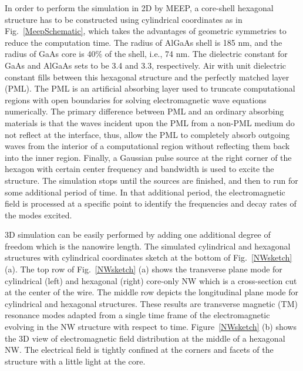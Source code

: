 In order to perform the simulation in 2D by MEEP, a core-shell hexagonal
structure has to be constructed using cylindrical coordinates as in
Fig.~\ref{MeepSchematic}, which takes the advantages of geometric symmetries to
reduce the computation time. The radius of AlGaAs shell is 185 nm, and the
radius of GaAs core is 40\% of the shell, i.e., 74 nm. The dielectric constant
for GaAs and AlGaAs sets to be 3.4 and 3.3, respectively. Air with unit
dielectric constant fills between this hexagonal structure and the perfectly
matched layer (PML). The PML is an artificial absorbing layer used to truncate
computational regions with open boundaries for solving electromagnetic wave
equations numerically. The primary difference between PML and an ordinary
absorbing materials is that the waves incident upon the PML from a non-PML
medium do not reflect at the interface, thus, allow the PML to completely
absorb outgoing waves from the interior of a computational region without
reflecting them back into the inner region. Finally, a Gaussian pulse source
at the right corner of the hexagon with certain center frequency and bandwidth
is used to excite the structure. The simulation stops until the sources are
finished, and then to run for some additional period of time. In that
additional period, the electromagnetic field is processed at a specific point
to identify the frequencies and decay rates of the modes excited.

3D simulation can be easily performed by adding one additional degree of
freedom which is the nanowire length. The simulated cylindrical and hexagonal
structures with cylindrical coordinates sketch at the bottom of
Fig.~\ref{NWsketch} (a). The top row of Fig.~\ref{NWsketch} (a) shows the
transverse plane mode for cylindrical (left) and hexagonal (right) core-only NW
which is a cross-section cut at the center of the wire. The middle row depicts
the longitudinal plane mode for cylindrical and hexagonal structures. These
results are transverse magnetic (TM) resonance modes adapted from a single time
frame of the electromagnetic evolving in the NW structure with respect to time.
Figure~\ref{NWsketch} (b) shows the 3D view of electromagnetic field
distribution at the middle of a hexagonal NW. The electrical field is tightly
confined at the corners and facets of the structure with a little light at the
core.

